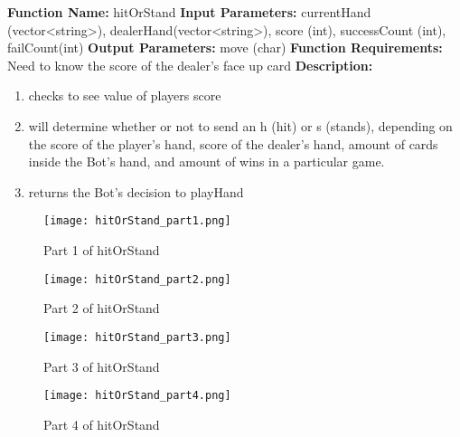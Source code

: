 {{{\newpage
\textbf{Function Name:} hitOrStand
\newline
\textbf{Input Parameters:} currentHand (vector<string>), dealerHand(vector<string>), score (int), successCount (int), failCount(int)
\newline
\textbf{Output Parameters:} move (char)
\newline
\textbf{Function Requirements:} Need to know the score of the dealer's face up card
\newline
\textbf{Description: }
\begin{enumerate}
	\item checks to see value of players score
	\item will determine whether or not to send an h (hit) or s (stands), depending on the score of the player's hand, score of the dealer's hand, amount of cards inside the Bot's hand, and amount of wins in a particular game.
	\item returns the Bot's decision to playHand
\end{enumerate}
\begin{figure}[H]
	\centering
	\texttt{[image: hitOrStand\_part1.png]}\\
	\caption{Part 1 of hitOrStand}
	\label{fig:tobias}
\end{figure}

\begin{figure}[H]
	\centering
	\texttt{[image: hitOrStand\_part2.png]}\\
	\caption{Part 2 of hitOrStand}
	\label{fig:tobias}
\end{figure}

\begin{figure}[H]
	\centering
	\texttt{[image: hitOrStand\_part3.png]}\\
	\caption{Part 3 of hitOrStand}
	\label{fig:tobias}
\end{figure}

\begin{figure}[H]
	\centering
	\texttt{[image: hitOrStand\_part4.png]}\\
	\caption{Part 4 of hitOrStand}
	\label{fig:tobias}
\end{figure}

}}}
